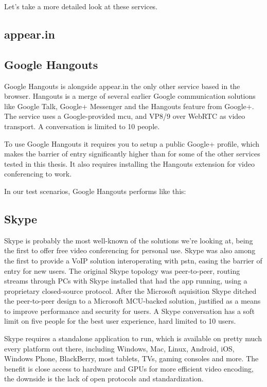 Let's take a more detailed look at these services.

\subsection{appear.in}



\subsection{Google Hangouts}

Google Hangouts is alongside appear.in the only other service based in the browser. Hangouts is a merge of several earlier Google communication solutions like Google Talk, Google+ Messenger and the Hangouts feature from Google+. The service uses a Google-provided \gls{mcu}, and VP8/9 over WebRTC as video transport. A conversation is limited to 10 people.

To use Google Hangouts it requires you to setup a public Google+ profile, which makes the barrier of entry significantly higher than for some of the other services tested in this thesis. It also requires installing the Hangouts extension for video conferencing to work.

In our test scenarios, Google Hangouts performs like this:



\subsection{Skype}

Skype is probably the most well-known of the solutions we're looking at, being the first to offer free video conferencing for personal use. Skype was also among the first to provide a VoIP solution interoperating with \gls{pstn}, easing the barrier of entry for new users. The original Skype topology was peer-to-peer, routing streams through PCs with Skype installed that had the app running, using a proprietary closed-source protocol. After the Microsoft aquisition Skype ditched the peer-to-peer design to a Microsoft MCU-backed solution, justified as a means to improve performance and security for users. A Skype conversation has a soft limit on five people for the best user experience, hard limited to 10 users.

Skype requires a standalone application to run, which is available on pretty much every platform out there, including Windows, Mac, Linux, Android, iOS, Windows Phone, BlackBerry, most tablets, TVs, gaming consoles and more. The benefit is close access to hardware and GPUs for more efficient video encoding, the downside is the lack of open protocols and standardization.

